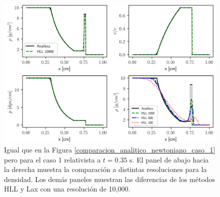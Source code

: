 \documentclass[12pt,a4paper]{book}
\begin{document}
\begin{figure}
  \centering
    \includegraphics[width=1.0\textwidth]{./Figuras/capitulo_3/caso_relativista/caso_rel_rar_shock.png}
  \caption{Igual que en la Figura \ref{comparacion_analitico_newtoniano_caso_1} pero para el caso 1 
  relativista 
  a $t = 0.35$ s. El panel de abajo 
  hacia la
  derecha muestra la comparación a distintas resoluciones para la densidad. Los demás paneles muestran
  las diferencias de los métodos HLL y Lax con una resolución de 10,000.}\label{caso_rel_rar_shock}
\end{figure}

\end{document}
